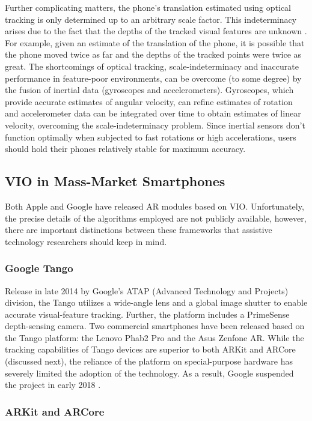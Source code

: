 \documentclass[chi_draft]{sigchi}
\begin{document}
Further complicating matters, the phone's translation estimated using optical tracking is only determined up to an arbitrary scale factor.  This indeterminacy arises due to the fact that the depths of the tracked visual features are unknown \cite{Hartley2004}.  For example, given an estimate of the translation of the phone, it is possible that the phone moved twice as far and the depths of the tracked points were twice as great.  The shortcomings of optical tracking, scale-indeterminacy and inaccurate performance in feature-poor environments, can be overcome (to some degree) by the fusion of inertial data (gyroscopes and accelerometers).  Gyroscopes, which provide accurate estimates of angular velocity, can refine estimates of rotation and accelerometer data can be integrated over time to obtain estimates of linear velocity, overcoming the scale-indeterminacy problem.  Since inertial sensors don't function optimally when subjected to fast rotations or high accelerations, users should hold their phones relatively stable for maximum accuracy.

\subsection{VIO in Mass-Market Smartphones}
Both Apple and Google have released AR modules based on VIO.  Unfortunately, the precise details of the algorithms employed are not publicly available, however, there are important distinctions between these frameworks that assistive technology researchers should keep in mind.

\subsubsection{Google Tango}
Release in late 2014 by Google's ATAP (Advanced Technology and Projects) division, the Tango utilizes a wide-angle lens and a global image shutter to enable accurate visual-feature tracking.  Further, the platform includes a PrimeSense depth-sensing camera.  Two commercial smartphones have been released based on the Tango platform: the Lenovo Phab2 Pro and the Asus Zenfone AR.  While the tracking capabilities of Tango devices are superior to both ARKit and ARCore (discussed next), the reliance of the platform on special-purpose hardware has severely limited the adoption of the technology.  As a result, Google suspended the project in early 2018 \cite{tangoretired}.


\subsubsection{ARKit and ARCore}
\end{document}
